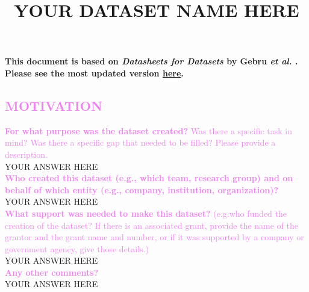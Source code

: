 \documentclass[letterpaper, 10 pt, conference]{ieeeconf}  %
\title{\LARGE \bf
YOUR DATASET NAME HERE
}
\newcommand{\sectioncolor}{violet}
\begin{document}
\maketitle
\thispagestyle{empty}
\pagestyle{empty}


\noindent
\textbf{
This document is based on \textit{Datasheets for Datasets} by Gebru \textit{et
al.} \cite{gebruDatasheetsDatasets2020}. Please see the most updated version
\underline{\textcolor{blue}{\href{http://arxiv.org/abs/1803.09010}{here}}}.
}


\begin{mdframed}[linecolor=\sectioncolor]
\section*{\textcolor{\sectioncolor}{
    MOTIVATION
}}
\end{mdframed}

    \textcolor{\sectioncolor}{\textbf{
    For what purpose was the dataset created?
    }
    Was there a specific task in mind? Was there
    a specific gap that needed to be filled? Please provide a description.
    } \\
    YOUR ANSWER HERE \\
    
    \textcolor{\sectioncolor}{\textbf{
    Who created this dataset (e.g., which team, research group) and on behalf
    of which entity (e.g., company, institution, organization)?
    }
    } \\
    YOUR ANSWER HERE \\
    
    \textcolor{\sectioncolor}{\textbf{
    What support was needed to make this dataset?
    }
    (e.g.who funded the creation of the dataset? If there is an associated
    grant, provide the name of the grantor and the grant name and number, or if
    it was supported by a company or government agency, give those details.)
    } \\
    YOUR ANSWER HERE \\
    
    \textcolor{\sectioncolor}{\textbf{
    Any other comments?
    }} \\
    YOUR ANSWER HERE \\
\end{document}
